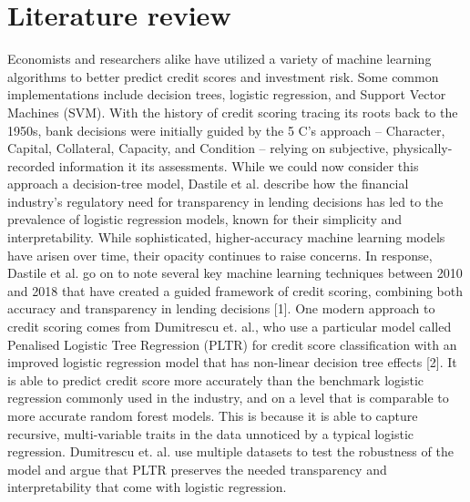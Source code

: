 \documentclass[conference, 11pt]{IEEEtran}
\begin{document}
\section{Literature review}
Economists and researchers alike have utilized a variety of machine learning algorithms to better predict credit scores and investment risk.
Some common implementations include decision trees, logistic regression, and Support Vector Machines (SVM).
\vspace{5mm}\newline
With the history of credit scoring tracing its roots back to the 1950s, bank decisions were initially guided by the
5 C's approach -- Character, Capital, Collateral, Capacity, and Condition -- relying on subjective, physically-recorded information it its
assessments.
While we could now consider this approach a decision-tree model, Dastile et al. describe how the financial industry's regulatory need for
transparency in lending decisions has led to the prevalence of logistic regression models, known for their simplicity and interpretability.
While sophisticated, higher-accuracy machine learning models have arisen over time, their opacity continues to raise concerns.
In response, Dastile et al. go on to note several key machine learning techniques between 2010 and 2018 that have created a guided
framework of credit scoring, combining both accuracy and transparency in lending decisions [1].
\vspace{5mm}\newline
One modern approach to credit scoring comes from Dumitrescu et. al., who use a particular model called Penalised Logistic Tree Regression
(PLTR) for credit score classification with an improved logistic regression model that has non-linear decision tree effects [2].
It is able to predict credit score more accurately than the benchmark logistic regression commonly used in the industry, and on a level
that is comparable to more accurate random forest models.
This is because it is able to capture recursive, multi-variable traits in the data unnoticed by a typical logistic regression.
Dumitrescu et. al. use multiple datasets to test the robustness of the model and argue that PLTR preserves the needed transparency and
interpretability that come with logistic regression.
\end{document}
